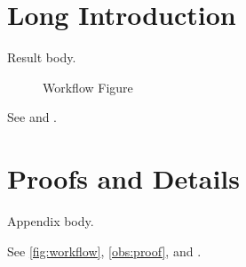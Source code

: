 \section[Short Intro]{Long Introduction}\label{sec:intro}
\begin{oblemma}\label{obs:main}
Result body.
\end{oblemma}
\begin{figure}\caption[Workflow Short]{Workflow Figure}\label{fig:workflow}\end{figure}
See  and .
\appendices
\section[Proof Notes]{Proofs and Details}\label{sec:proof}
\begin{oblemma}\label{obs:proof}
Appendix body.
\end{oblemma}
See \autoref{fig:workflow}, \cref{obs:proof}, and .
